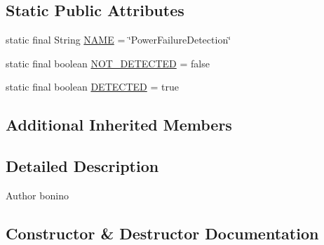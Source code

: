 \subsection*{Static Public Attributes}
\begin{DoxyCompactItemize}
\item 
static final String \hyperlink{classit_1_1polito_1_1elite_1_1enocean_1_1enj_1_1eep_1_1eep26_1_1attributes_1_1_e_e_p26_power_failure_detection_a8bd8b8d929bced218276989cf1d89eff}{N\+A\+ME} = \char`\"{}Power\+Failure\+Detection\char`\"{}
\item 
static final boolean \hyperlink{classit_1_1polito_1_1elite_1_1enocean_1_1enj_1_1eep_1_1eep26_1_1attributes_1_1_e_e_p26_power_failure_detection_ae8b795787b77c354a1111b5e70db4d05}{N\+O\+T\+\_\+\+D\+E\+T\+E\+C\+T\+ED} = false
\item 
static final boolean \hyperlink{classit_1_1polito_1_1elite_1_1enocean_1_1enj_1_1eep_1_1eep26_1_1attributes_1_1_e_e_p26_power_failure_detection_aa4e6d4ec9e104cda433077317787b083}{D\+E\+T\+E\+C\+T\+ED} = true
\end{DoxyCompactItemize}
\subsection*{Additional Inherited Members}


\subsection{Detailed Description}
\begin{DoxyAuthor}{Author}
bonino 
\end{DoxyAuthor}


\subsection{Constructor \& Destructor Documentation}
\hypertarget{classit_1_1polito_1_1elite_1_1enocean_1_1enj_1_1eep_1_1eep26_1_1attributes_1_1_e_e_p26_power_failure_detection_aaa81a7d4644f23a9990ae9786241e1fa}{}\label{classit_1_1polito_1_1elite_1_1enocean_1_1enj_1_1eep_1_1eep26_1_1attributes_1_1_e_e_p26_power_failure_detection_aaa81a7d4644f23a9990ae9786241e1fa} 
